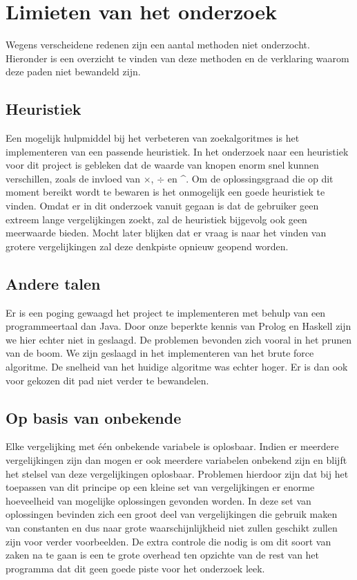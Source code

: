 \documentclass[Main.tex]{subfiles}
\begin{document}
\section{Limieten van het onderzoek}

Wegens verscheidene redenen zijn een aantal methoden niet onderzocht. Hieronder is een overzicht te vinden van deze methoden en de verklaring waarom deze paden niet bewandeld zijn. 

\subsection{Heuristiek}
Een mogelijk hulpmiddel bij het verbeteren van zoekalgoritmes is het implementeren van een passende heuristiek. In het onderzoek naar een heuristiek voor dit project is gebleken dat de waarde van knopen enorm snel kunnen verschillen, zoals de invloed van $\times$, $\div$ en \^{}. Om de oplossingsgraad die op dit moment bereikt wordt te bewaren is het onmogelijk een goede heuristiek te vinden. Omdat er in dit onderzoek vanuit gegaan is dat de gebruiker geen extreem lange vergelijkingen zoekt, zal de heuristiek bijgevolg ook geen meerwaarde bieden. Mocht later blijken dat er vraag is naar het vinden van grotere vergelijkingen zal deze denkpiste opnieuw geopend worden.

\subsection{Andere talen}
Er is een poging gewaagd het project te implementeren met behulp van een programmeertaal dan Java. Door onze beperkte kennis van Prolog en Haskell zijn we hier echter niet in geslaagd. De problemen bevonden zich vooral in het prunen van de boom. We zijn geslaagd in het implementeren van het brute force algoritme. De snelheid van het huidige algoritme was echter hoger. Er is dan ook voor gekozen dit pad niet verder te bewandelen.

\subsection{Op basis van onbekende}
Elke vergelijking met \'e\'en onbekende variabele is oplosbaar. Indien er meerdere vergelijkingen zijn dan mogen er ook meerdere variabelen onbekend zijn en blijft het stelsel van deze vergelijkingen oplosbaar. Problemen hierdoor zijn dat bij het toepassen van dit principe op een kleine set van vergelijkingen er enorme hoeveelheid van mogelijke oplossingen gevonden worden. In deze set van oplossingen bevinden zich een groot deel van vergelijkingen die gebruik maken van constanten en dus naar grote waarschijnlijkheid niet zullen geschikt zullen zijn voor verder voorbeelden. De extra controle die nodig is om dit soort van zaken na te gaan is een te grote overhead ten opzichte van de rest van het programma dat dit geen goede piste voor het onderzoek leek.
\end{document}
